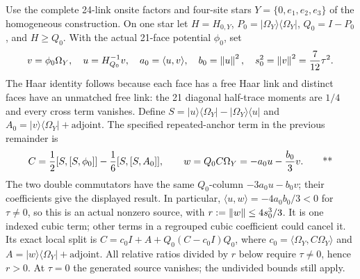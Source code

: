 Use the complete 24-link onsite factors and four-site stars
$Y=\{0,e_1,e_2,e_3\}$ of the homogeneous construction.  On one star let $H=H_{0,Y}$,
$P_0=|\Omega_Y\rangle\langle\Omega_Y|$, $Q_0=I-P_0$, and $H\ge Q_0$.  With the
actual 21-face potential $\phi_0$, set
\begin{equation}
 v=\phi_0\Omega_Y,\quad u=H_{Q_0}^{-1}v,\quad
 a_0=\langle u,v\rangle,\quad b_0=\left\lVert u\right\rVert^2,\quad
 s_0^2=\left\lVert v\right\rVert^2=\frac7{12}\tau^2 .
 \label{recent:source-data}
\end{equation}
The Haar identity follows because each face has a free Haar link and distinct
faces have an unmatched free link: the 21 diagonal half-trace moments are
$1/4$ and every cross term vanishes.  Define
$S=|u\rangle\langle\Omega_Y|-|\Omega_Y\rangle\langle u|$ and
$A_0=|v\rangle\langle\Omega_Y|+\mathrm{adjoint}$.  The specified repeated-anchor
term in the previous remainder is
\begin{equation}
 C=\frac12[S,[S,\phi_0]]-\frac16[S,[S,A_0]],\qquad
 w=Q_0C\Omega_Y=-a_0u-\frac{b_0}{3}v. \qquad\text{**}
 \label{recent:cubic-source}
\end{equation}
The two double commutators have the same $Q_0$-column
$-3a_0u-b_0v$; their coefficients give the displayed result.  In particular,
$\langle u,w\rangle=-4a_0b_0/3<0$ for $\tau\ne0$, so this is an actual nonzero
source, with $r:=\left\lVert w\right\rVert\le4s_0^3/3$.  It is one indexed cubic term; other
terms in a regrouped cubic coefficient could cancel it.  Its exact local split
is $C=c_0I+A+Q_0(C-c_0I)Q_0$, where $c_0=\langle\Omega_Y,C\Omega_Y\rangle$
and $A=|w\rangle\langle\Omega_Y|+\mathrm{adjoint}$.
All relative ratios divided by $r$ below require $\tau\ne0$, hence $r>0$.
At $\tau=0$ the generated source vanishes; the undivided bounds still apply.


